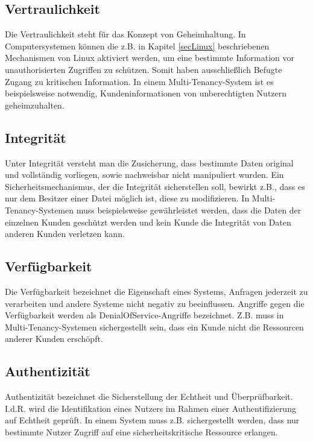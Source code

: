 \documentclass[../main.tex]{subfiles}
\begin{document}


    \subsection{Vertraulichkeit}
			Die Vertraulichkeit steht für das Konzept von Geheimhaltung. In Computersystemen können die z.B. in Kapitel \ref{secLinux} beschriebenen Mechanismen von Linux aktiviert werden, um eine bestimmte Information vor unauthorisierten Zugriffen zu schützen. Somit haben ausschließlich Befugte Zugang zu kritischen Information. In einem Multi-Tenancy-System ist es beispielsweise notwendig, Kundeninformationen von unberechtigten Nutzern geheimzuhalten.

    \subsection{Integrität}
			Unter Integrität versteht man die Zusicherung, dass bestimmte Daten original und vollständig vorliegen, sowie nachweisbar nicht manipuliert wurden. Ein Sicherheitsmechanismus, der die Integrität sicherstellen soll, bewirkt z.B., dass es nur dem Besitzer einer Datei möglich ist, diese zu modifizieren. In Multi-Tenancy-Systemen muss beispielsweise gewährleistet werden, dass die Daten der einzelnen Kunden geschützt werden und kein Kunde die Integrität von Daten anderen Kunden verletzen kann.

    \subsection{Verfügbarkeit}
			Die Verfügbarkeit bezeichnet die Eigenschaft eines Systems, Anfragen jederzeit zu verarbeiten und andere Systeme nicht negativ zu beeinflussen. Angriffe gegen die Verfügbarkeit werden als \gls{DenialOfService}-Angriffe bezeichnet. Z.B. muss in Multi-Tenancy-Systemen sichergestellt sein, dass ein Kunde nicht die Ressourcen anderer Kunden erschöpft.

		\subsection{Authentizität}
			Authentizität bezeichnet die Sicherstellung der Echtheit und Überprüfbarkeit. I.d.R. wird die Identifikation eines Nutzers im Rahmen einer Authentifizierung auf Echtheit geprüft. In einem System muss z.B. sichergestellt werden, dass nur bestimmte Nutzer Zugriff auf eine sicherheitskritische Ressource erlangen.
\end{document}
